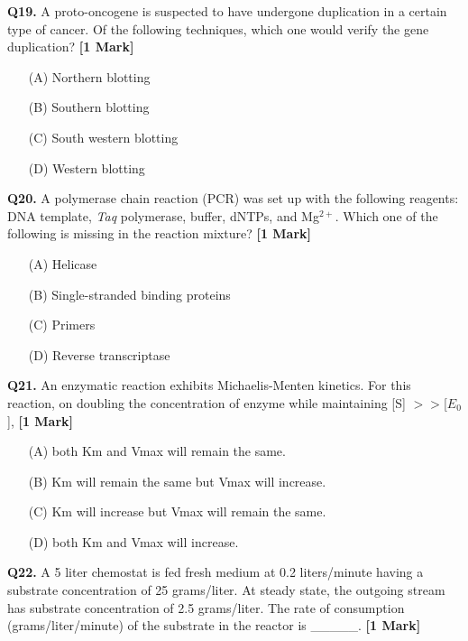 \documentclass[11pt]{article}
\newcommand{\questiona}[2]{
    \noindent\textbf{Q#2.} #1 \hfill \textbf{[1 Mark]}
}
\begin{document}
\vspace{0.5cm}

\questiona{A proto-oncogene is suspected to have undergone duplication in a certain type of cancer. Of the following techniques, which one would verify the gene duplication?}{19}
\begin{enumerate}
    \item[(A)] Northern blotting
    \item[(B)] Southern blotting  
    \item[(C)] South western blotting
    \item[(D)] Western blotting
\end{enumerate}

\vspace{0.5cm}

\questiona{A polymerase chain reaction (PCR) was set up with the following reagents: DNA template, \textit{Taq} polymerase, buffer, dNTPs, and Mg$^{2+}$. Which one of the following is missing in the reaction mixture?}{20}
\begin{enumerate}
    \item[(A)] Helicase
    \item[(B)] Single-stranded binding proteins  
    \item[(C)] Primers
    \item[(D)] Reverse transcriptase
\end{enumerate}

\vspace{0.5cm}

\questiona{An enzymatic reaction exhibits Michaelis-Menten kinetics. For this reaction, on doubling the concentration of enzyme while maintaining [S] $>>$[$E_0$],}{21}
\begin{enumerate}
    \item[(A)] both Km and Vmax will remain the same.
    \item[(B)] Km will remain the same but Vmax will increase.  
    \item[(C)] Km will increase but Vmax will remain the same.
    \item[(D)] both Km and Vmax will increase.
\end{enumerate}

\vspace{0.5cm}

\questiona{A 5 liter chemostat is fed fresh medium at 0.2 liters/minute having a substrate concentration of 25 grams/liter. At steady state, the outgoing stream has substrate concentration of 2.5 grams/liter. The rate of consumption (grams/liter/minute) of the substrate in the reactor is \_\_\_\_\_.}{22}
\end{document}
